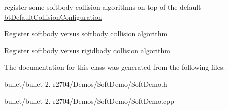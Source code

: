 register some softbody collision algorithms on top of the default \hyperlink{classbt_default_collision_configuration}{bt\+Default\+Collision\+Configuration}

Register softbody versus softbody collision algorithm

Register softbody versus rigidbody collision algorithm 

The documentation for this class was generated from the following files\+:\begin{DoxyCompactItemize}
\item 
bullet/bullet-\/2.-\/r2704/\+Demos/\+Soft\+Demo/Soft\+Demo.\+h\item 
bullet/bullet-\/2.-\/r2704/\+Demos/\+Soft\+Demo/Soft\+Demo.\+cpp\end{DoxyCompactItemize}
